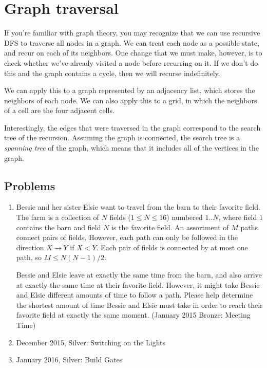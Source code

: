 \documentclass{article}
\begin{document}
\section{Graph traversal}
If you're familiar with graph theory, you may recognize that we can use recursive DFS to traverse all nodes in a graph. We can treat each node as a possible state, and recur on each of its neighbors. One change that we must make, however, is to check whether we've already visited a node before recurring on it. If we don't do this and the graph contains a cycle, then we will recurse indefinitely.

We can apply this to a graph represented by an adjacency list, which stores the neighbors of each node. We can also apply this to a grid, in which the neighbors of a cell are the four adjacent cells.

Interestingly, the edges that were traversed in the graph correspond to the search tree of the recursion. Assuming the graph is connected, the search tree is a \textit{spanning tree} of the graph, which means that it includes all of the vertices in the graph.

\subsection{Problems}

\begin{enumerate}
    \item Bessie and her sister Elsie want to travel from the barn to their favorite field. The farm is a collection of $N$ fields ($1 \le N \le 16$) numbered $1..N$, where field $1$ contains the barn and field $N$ is the favorite field. An assortment of $M$ paths connect pairs of fields. However, each path can only be followed in the direction $X \rightarrow Y$ if $X < Y$. Each pair of fields is connected by at most one path, so $M \le N(N-1)/2$.

    Bessie and Elsie leave at exactly the same time from the barn, and also arrive at exactly the same time at their favorite field. However, it might take Bessie and Elsie different amounts of time to follow a path. Please help determine the shortest amount of time Bessie and Elsie must take in order to reach their favorite field at exactly the same moment. (January 2015 Bronze: Meeting Time)
    \item December 2015, Silver: Switching on the Lights
    \item January 2016, Silver: Build Gates
\end{enumerate}
\end{document}
